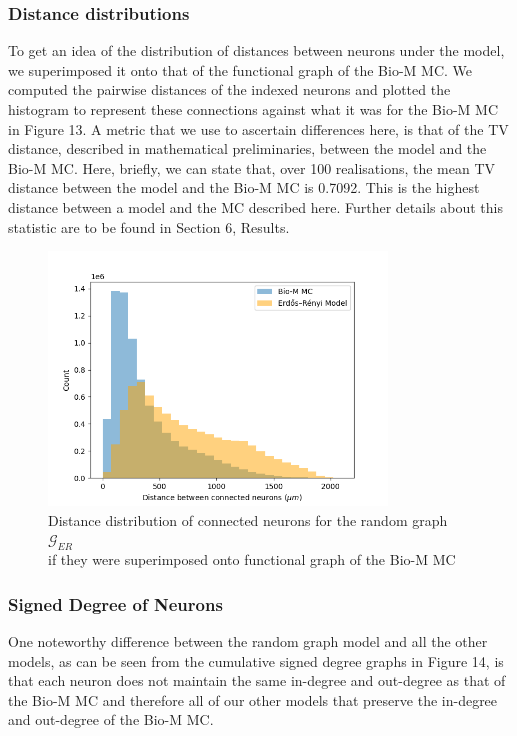 \subsubsection{Distance distributions}
To get an idea of the distribution of distances between neurons under the \ER model, we superimposed it onto that of the functional graph of the Bio-M MC. We computed the pairwise distances of the indexed neurons and plotted the histogram to represent these connections against what it was for the Bio-M MC in Figure 13. A metric that we use to ascertain differences here, is that of the TV distance, described in mathematical preliminaries, between the \ER model and the Bio-M MC. Here, briefly, we can state that, over 100 realisations, the mean TV distance between the \ER model and the Bio-M MC is 0.7092. This is the highest distance between a model and the MC described here. Further details about this statistic are to be found in Section 6, Results.
\begin{figure}[H]
\begin{center}
\captionsetup{justification=centering}
\includegraphics[width=9cm]{ER/Erdos_Renyi_dist_distr.png}
\caption{Distance distribution of connected neurons for the random graph $\mathcal{G}_{ER}$ \\if they were superimposed onto functional graph of the Bio-M MC}
\end{center}
\end{figure}

\subsubsection{Signed Degree of Neurons}
One noteworthy difference between the \ER random graph model and all the other models, as can be seen from the cumulative signed degree graphs in Figure 14, is that each neuron does not maintain the same in-degree and out-degree as that of the Bio-M MC and therefore all of our other models that preserve the in-degree and out-degree of the Bio-M MC.

